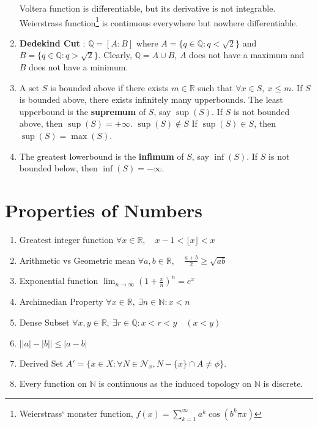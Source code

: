 \begin{enumerate}
		\subitem Voltera function is differentiable, but its derivative is not integrable.
		\subitem Weierstrass function\footnote{Weierstrass` monster function, $f(x) = \sum_{k=1}^\infty a^k \cos (b^k\pi x)$ } is continuous everywhere but nowhere differentiable.
	\item \textbf{Dedekind Cut} : $\mathbb{Q} = [A:B]$ where $A = \{ q \in \mathbb{Q} : q < \sqrt{2} \}$ and $B = \{ q \in \mathbb{Q} : q > \sqrt{2} \}$. Clearly, $\mathbb{Q} = A \cup B$, $A$ does not have a maximum and $B$ does not have a minimum.
	\item A set $S$ is bounded above if there exists $m \in \mathbb{R}$ such that $\forall x \in S,\ x \le m$. If $S$ is bounded above, there exists infinitely many upperbounds. The least upperbound is the \textbf{supremum} of $S$, say $\sup(S)$. If $S$ is not bounded above, then $\sup(S) = +\infty$.
		\subitem $\sup(S) \notin S$
		\subitem If $\sup(S) \in S$, then $\sup(S) = \max(S)$.
	\item The greatest lowerbound is the \textbf{infimum} of $S$, say $\inf(S)$. If $S$ is not bounded below, then $\inf(S) = -\infty$.
\end{enumerate}

\section{Properties of Numbers}
\begin{enumerate}
	\item Greatest integer function
		$ \forall x \in \mathbb{R},\quad x-1 < \lfloor x \rfloor < x $ %
	\item Arithmetic vs Geometric mean
		$ \forall a,b \in \mathbb{R},\quad \frac{a+b}{2} \ge \sqrt{ab} $ 
	\item Exponential function
		$ \displaystyle \lim_{n \to \infty} \left(1+\frac{x}{n}\right)^n = e^x $
	\item Archimedian Property
		$ \forall x \in \mathbb{R},\ \exists n \in \mathbb{N} : x < n $ 
	\item Dense Subset
		$ \forall x,y \in \mathbb{R},\ \exists r \in \mathbb{Q} : x < r < y \quad (x<y) $
	\item $ \left| |a|-|b| \right|  \le |a-b| $
	\item Derived Set $A' = \{ x \in X : \forall N \in \mathcal{N}_x, N-\{x\} \cap A \ne \phi \}$.
	\item Every function on $\mathbb{N}$ is continuous as the induced topology on $\mathbb{N}$ is discrete.
\end{enumerate}

